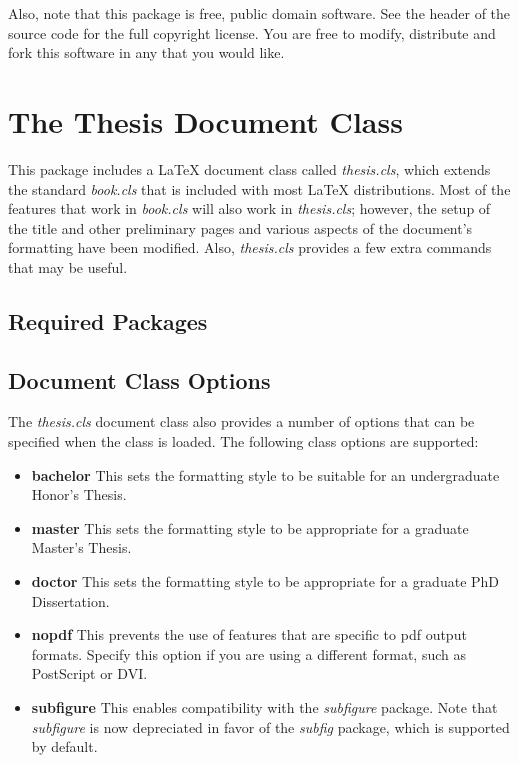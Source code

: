 \documentclass[master]{thesis}
\begin{document}
Also, note that this package is free, public domain software.  See the header of the source code for the full copyright license.  You are free to modify, distribute and fork this software in any that you would like.

\chapter{The Thesis Document Class}

This package includes a \LaTeX{} document class called \textit{thesis.cls}, which extends the standard \textit{book.cls} that is included with most \LaTeX{} distributions.  Most of the features that work in \textit{book.cls} will also work in \textit{thesis.cls}; however, the setup of the title and other preliminary pages and various aspects of the document's formatting have been modified.  Also, \textit{thesis.cls} provides a few extra commands that may be useful.

\section{Required Packages}

\section{Document Class Options}

The \textit{thesis.cls} document class also provides a number of options that can be specified when the class is loaded.  The following class options are supported:

\begin{itemize}
    \item \textbf{bachelor}  This sets the formatting style to be suitable for an undergraduate Honor's Thesis.
    \item \textbf{master}  This sets the formatting style to be appropriate for a graduate Master's Thesis.
    \item \textbf{doctor}  This sets the formatting style to be appropriate for a graduate PhD Dissertation.
    \item \textbf{nopdf}  This prevents the use of features that are specific to pdf output formats.  Specify this option if you are using a different format, such as PostScript or DVI.
    \item \textbf{subfigure}  This enables compatibility with the \textit{subfigure} package.  Note that \textit{subfigure} is now depreciated in favor of the \textit{subfig} package, which is supported by default.
\end{itemize}
\end{document}
